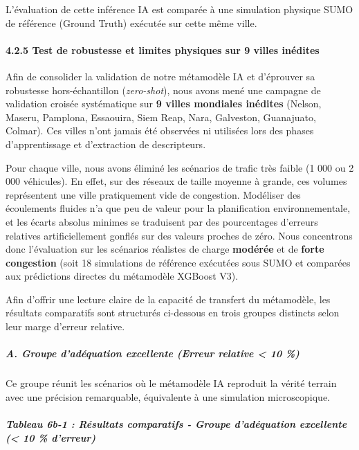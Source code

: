 \documentclass[10pt, a4paper]{article}
\begin{document}
L'évaluation de cette inférence IA est comparée à une simulation
physique SUMO de référence (Ground Truth) exécutée sur cette même ville.

\paragraph{4.2.5 Test de robustesse et limites physiques sur 9 villes
inédites}\label{test-de-robustesse-et-limites-physiques-sur-9-villes-inuxe9dites}

Afin de consolider la validation de notre métamodèle IA et d'éprouver sa
robustesse hors-échantillon (\emph{zero-shot}), nous avons mené une
campagne de validation croisée systématique sur \textbf{9 villes
mondiales inédites} (Nelson, Maseru, Pamplona, Essaouira, Siem Reap,
Nara, Galveston, Guanajuato, Colmar). Ces villes n'ont jamais été
observées ni utilisées lors des phases d'apprentissage et d'extraction
de descripteurs.

Pour chaque ville, nous avons éliminé les scénarios de trafic très
faible (1 000 ou 2 000 véhicules). En effet, sur des réseaux de taille
moyenne à grande, ces volumes représentent une ville pratiquement vide
de congestion. Modéliser des écoulements fluides n'a que peu de valeur
pour la planification environnementale, et les écarts absolus minimes se
traduisent par des pourcentages d'erreurs relatives artificiellement
gonflés sur des valeurs proches de zéro. Nous concentrons donc
l'évaluation sur les scénarios réalistes de charge \textbf{modérée} et
de \textbf{forte congestion} (soit 18 simulations de référence exécutées
sous SUMO et comparées aux prédictions directes du métamodèle XGBoost
V3).

Afin d'offrir une lecture claire de la capacité de transfert du
métamodèle, les résultats comparatifs sont structurés ci-dessous en
trois groupes distincts selon leur marge d'erreur relative.

\subparagraph{A. Groupe d'adéquation excellente (Erreur relative
\textless{} 10
\%)}\label{a.-groupe-daduxe9quation-excellente-erreur-relative-10}

Ce groupe réunit les scénarios où le métamodèle IA reproduit la vérité
terrain avec une précision remarquable, équivalente à une simulation
microscopique.

\subparagraph{Tableau 6b-1 : Résultats comparatifs - Groupe d'adéquation
excellente (\textless{} 10 \%
d'erreur)}\label{tableau-6b-1-ruxe9sultats-comparatifs---groupe-daduxe9quation-excellente-10-derreur}
\end{document}
